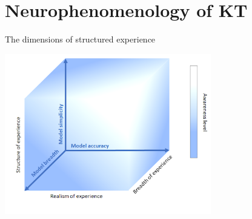 \section{Neurophenomenology of KT}


\begin{frame}[label=ladila]{The dimensions of structured experience}
  
 \begin{center}%
  \includegraphics[height=7cm]{img/3dKT.png}
  \end{center}
  
 
\end{frame}


